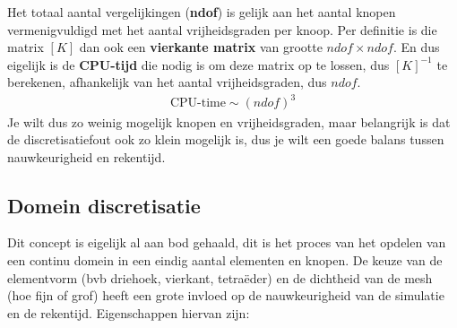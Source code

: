 \documentclass[a4paper,11pt,twoside]{report}
\begin{document}
Het totaal aantal vergelijkingen (\textbf{ndof}) is gelijk aan het aantal knopen vermenigvuldigd met
het aantal vrijheidsgraden per knoop.
\newline
Per definitie is die matrix $[K]$ dan ook een \textbf{vierkante matrix} van grootte
$ndof \times ndof$. En dus eigelijk is de \textbf{CPU-tijd} die nodig is om deze matrix op te
lossen, dus $[K]^{-1}$ te berekenen, afhankelijk van het aantal vrijheidsgraden, dus $ndof$.
\begin{align*}
    \text{CPU-time} \sim (ndof)^3
\end{align*}
Je wilt dus zo weinig mogelijk knopen en vrijheidsgraden, maar belangrijk is dat de
discretisatiefout ook zo klein mogelijk is, dus je wilt een goede balans tussen nauwkeurigheid en
rekentijd.
\newpage
\subsection{Domein discretisatie}
Dit concept is eigelijk al aan bod gehaald, dit is het proces van het opdelen van een continu domein
in een eindig aantal elementen en knopen. De keuze van de elementvorm (bvb driehoek, vierkant,
tetraëder) en de dichtheid van de mesh (hoe fijn of grof) heeft een grote invloed op de
nauwkeurigheid van de simulatie en de rekentijd.
\newline
Eigenschappen hiervan zijn:
\end{document}
